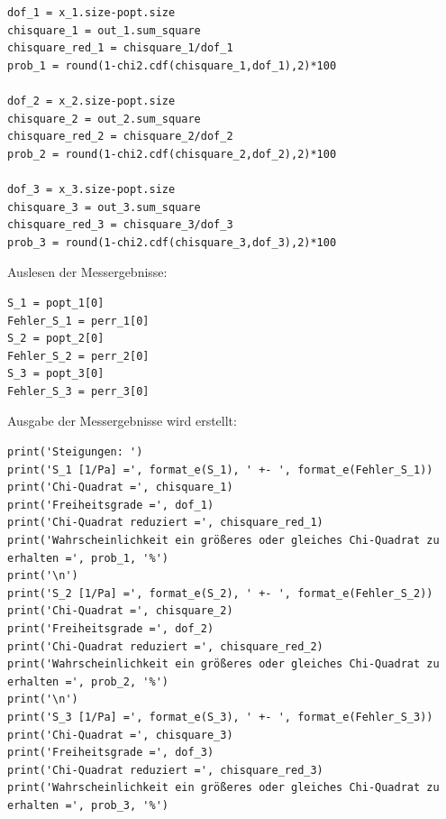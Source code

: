 \documentclass[a4paper,10pt]{article}
\begin{document}
\begin{lstlisting}
dof_1 = x_1.size-popt.size
chisquare_1 = out_1.sum_square
chisquare_red_1 = chisquare_1/dof_1
prob_1 = round(1-chi2.cdf(chisquare_1,dof_1),2)*100

dof_2 = x_2.size-popt.size
chisquare_2 = out_2.sum_square
chisquare_red_2 = chisquare_2/dof_2
prob_2 = round(1-chi2.cdf(chisquare_2,dof_2),2)*100

dof_3 = x_3.size-popt.size
chisquare_3 = out_3.sum_square
chisquare_red_3 = chisquare_3/dof_3
prob_3 = round(1-chi2.cdf(chisquare_3,dof_3),2)*100

\end{lstlisting}

Auslesen der Messergebnisse:\begin{lstlisting}
S_1 = popt_1[0]
Fehler_S_1 = perr_1[0]
S_2 = popt_2[0]
Fehler_S_2 = perr_2[0]
S_3 = popt_3[0]
Fehler_S_3 = perr_3[0]

\end{lstlisting}

Ausgabe der Messergebnisse wird erstellt:\begin{lstlisting}
print('Steigungen: ')
print('S_1 [1/Pa] =', format_e(S_1), ' +- ', format_e(Fehler_S_1))
print('Chi-Quadrat =', chisquare_1)
print('Freiheitsgrade =', dof_1)
print('Chi-Quadrat reduziert =', chisquare_red_1)
print('Wahrscheinlichkeit ein größeres oder gleiches Chi-Quadrat zu erhalten =', prob_1, '%')
print('\n')
print('S_2 [1/Pa] =', format_e(S_2), ' +- ', format_e(Fehler_S_2))
print('Chi-Quadrat =', chisquare_2)
print('Freiheitsgrade =', dof_2)
print('Chi-Quadrat reduziert =', chisquare_red_2)
print('Wahrscheinlichkeit ein größeres oder gleiches Chi-Quadrat zu erhalten =', prob_2, '%')
print('\n')
print('S_3 [1/Pa] =', format_e(S_3), ' +- ', format_e(Fehler_S_3))
print('Chi-Quadrat =', chisquare_3)
print('Freiheitsgrade =', dof_3)
print('Chi-Quadrat reduziert =', chisquare_red_3)
print('Wahrscheinlichkeit ein größeres oder gleiches Chi-Quadrat zu erhalten =', prob_3, '%')
\end{lstlisting}
\end{document}
